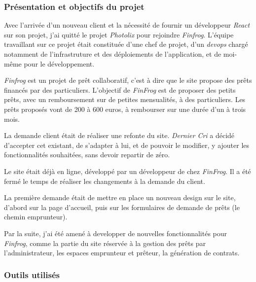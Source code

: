 \subsubsection{Présentation et objectifs du
projet}\label{pruxe9sentation-et-objectifs-du-projet-1}

\bigskip

Avec l'arrivée d'un nouveau client et la nécessité de fournir un
développeur \emph{React} sur son projet, j'ai quitté le projet
\emph{Photolix} pour rejoindre \emph{Finfrog}. L'équipe travaillant sur
ce projet était constituée d'une chef de projet, d'un \emph{devops}
chargé notamment de l'infrastruture et des déploiements de
l'application, et de moi-même pour le développement.

\bigskip

\emph{Finfrog} est un projet de prêt collaboratif, c'est à dire que le
site propose des prêts financés par des particuliers. L'objectif de
\emph{FinFrog} est de proposer des petits prêts, avec un remboursement
sur de petites mensualités, à des particuliers. Les prêts proposés vont
de 200 à 600 euros, à rembourser sur une durée d'un à trois mois.

\bigskip
La demande client était de réaliser une refonte du site. \emph{Dernier
Cri} a décidé d'accepter cet existant, de s'adapter à lui, et de pouvoir
le modifier, y ajouter les fonctionnalités souhaitées, sans devoir
repartir de zéro.

\bigskip

Le site était déjà en ligne, développé par un développeur de chez
\emph{FinFrog}. Il a été fermé le temps de réaliser les changements à la
demande du client.

\bigskip

La première demande était de mettre en place un nouveau design sur le
site, d'abord sur la page d'accueil, puis sur les formulaires de demande
de prêts (le chemin emprunteur).

\bigskip

Par la suite, j'ai été amené à developper de nouvelles fonctionnalités
pour \emph{Finfrog}, comme la partie du site réservée à la gestion des
prêts par l'administrateur, les espaces emprunteur et prêteur, la
génération de contrats.

\bigskip

\subsubsection{Outils utilisés}\label{outils-utilisuxe9s-1}

